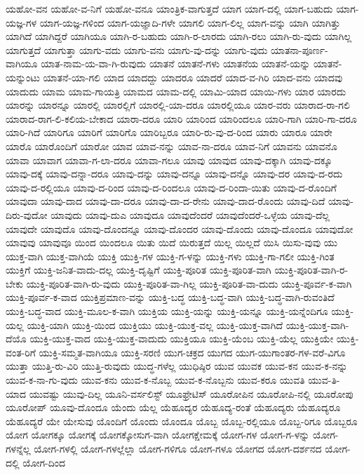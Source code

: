 {ಯಹೋ-ವನ
ಯಹೋ-ವ-ನಿಗೆ
ಯಹೋ-ವನೂ
ಯಾಂತ್ರಿಕ-ವಾಗುತ್ತದೆ
ಯಾಗ
ಯಾಗ-ದಲ್ಲಿ
ಯಾಗ-ಬಹುದು
ಯಾಗ-ಯಜ್ಞ-ಗಳ
ಯಾಗ-ಯಜ್ಞ-ಗಳಿಂದ
ಯಾಗ-ಯಜ್ಞಾದಿ-ಗಳೇ
ಯಾಗಲಿ
ಯಾಗ-ಲಿಲ್ಲ
ಯಾಗ-ವನ್ನು
ಯಾಗಿ
ಯಾಗಿತ್ತು
ಯಾಗಿದೆ
ಯಾಗಿದ್ದರೆ
ಯಾಗಿಯೂ
ಯಾಗಿ-ರ-ಬಹುದು
ಯಾಗಿ-ರ-ಲಾರದು
ಯಾಗಿ-ರಲು
ಯಾಗಿ-ರು-ವುದು
ಯಾಗಿಲ್ಲ
ಯಾಗುತ್ತದೆ
ಯಾಗುತ್ತಾ
ಯಾಗು-ವದು
ಯಾಗು-ವನು
ಯಾಗು-ವು-ದನ್ನು
ಯಾಗು-ವುದು
ಯಾತನಾ-ಪೂರ್ಣ-ವಾಗಿಯೂ
ಯಾತ-ನಾಮ-ಯ-ವಾ-ಗಿ-ರುವುದು
ಯಾತನೆ
ಯಾತನೆ-ಗಳು
ಯಾತನೆಯ
ಯಾತನೆ-ಯನ್ನು
ಯಾತನೆ-ಯನ್ನುಂಟು
ಯಾತನೆ-ಯಾ-ಗಲಿ
ಯಾದ
ಯಾದದ್ದು
ಯಾದರೂ
ಯಾದರೆ
ಯಾದ-ವ-ಗಿರಿ
ಯಾದ-ವನು
ಯಾದವು
ಯಾದುದು
ಯಾಮ
ಯಾಮ-ಗಾಯತ್ರಿ
ಯಾಮದ
ಯಾಮ-ದಲ್ಲಿ
ಯಾಮಿ-ಯಾದ
ಯಾಯಿ-ಗಳು
ಯಾರ
ಯಾರದು
ಯಾರನ್ನು
ಯಾರನ್ನೂ
ಯಾರಲ್ಲಿ
ಯಾರಲ್ಲಿಗೆ
ಯಾರಲ್ಲಿ-ಯಾ-ದರೂ
ಯಾರಲ್ಲಿಯೂ
ಯಾರ-ವರು
ಯಾರಾದ-ರಾ-ಗಲಿ
ಯಾರಾದ-ರಾಗ-ಲಿ-ಕಲಿಯ-ಬೇಕಾದ
ಯಾರಾ-ದರೂ
ಯಾರಿ
ಯಾರಿಂದ
ಯಾರಿಂದಲೂ
ಯಾರಿ-ಗಾಗಿ
ಯಾರಿ-ಗಾ-ದರೂ
ಯಾರಿ-ಗಿದೆ
ಯಾರಿಗೂ
ಯಾರಿಗೆ
ಯಾರಿಗೊ
ಯಾರಿಬ್ಬರೂ
ಯಾರಿ-ರು-ವು-ದ-ರಿಂದ
ಯಾರು
ಯಾರೂ
ಯಾರೇ
ಯಾರೊ
ಯಾರೊಂದಿಗೆ
ಯಾರೋ
ಯಾವ
ಯಾವ-ನನ್ನು
ಯಾವ-ನಾ-ದರೂ
ಯಾವ-ನಿಗೆ
ಯಾವನು
ಯಾವನೊ
ಯಾವಾ
ಯಾವಾಗ
ಯಾವಾ-ಗ-ಲಾ-ದರೂ
ಯಾವಾ-ಗಲೂ
ಯಾವು
ಯಾವುದ
ಯಾವು-ದಕ್ಕಾಗಿ
ಯಾವು-ದಕ್ಕೂ
ಯಾವು-ದಕ್ಕೆ
ಯಾವು-ದನ್ನಾ-ದರೂ
ಯಾವು-ದನ್ನು
ಯಾವು-ದನ್ನೂ
ಯಾವು-ದನ್ನೊ
ಯಾವು-ದರ
ಯಾವು-ದ-ರದು
ಯಾವು-ದ-ರಲ್ಲಿಯೂ
ಯಾವು-ದ-ರಿಂದ
ಯಾವು-ದ-ರಿಂದಲೂ
ಯಾವು-ದ-ರಿಂದಾ-ಯಿತು
ಯಾವು-ದ-ರೊಂದಿಗೆ
ಯಾವುದಾ
ಯಾವು-ದಾದ
ಯಾವು-ದಾ-ದರೂ
ಯಾವು-ದಾ-ದ-ರೇನು
ಯಾವು-ದಾದ-ರೊಂದು
ಯಾವು-ದಿದೆ
ಯಾವು-ದಿರು-ವುದೋ
ಯಾವುದು
ಯಾವು-ದುಎ
ಯಾವುದೂ
ಯಾವುದೆಂದರೆ
ಯಾವುದೆಂದರೆ-ಒಳ್ಳೆಯ
ಯಾವು-ದೆಲ್ಲ
ಯಾವುದೇ
ಯಾವುದೊ
ಯಾವು-ದೊಂದನ್ನೂ
ಯಾವು-ದೊಂದರ
ಯಾವು-ದೊಂದು
ಯಾವು-ದೊಂದೂ
ಯಾವುದೋ
ಯಾವುವು
ಯಾವುವೂ
ಯಿಂದ
ಯಿಂದಲೂ
ಯಿತು
ಯಿದೆ
ಯಿರುತ್ತದೆ
ಯಿಲ್ಲ
ಯಿಲ್ಲದೆ
ಯಿಸಿ
ಯಿಸು-ವುವು
ಯು
ಯುಕ್ತ-ವಾಗಿ
ಯುಕ್ತ-ವಾಗಿಯೆ
ಯುಕ್ತಿ
ಯುಕ್ತಿ-ಗಳ
ಯುಕ್ತಿ-ಗ-ಳನ್ನು
ಯುಕ್ತಿ-ಗಳು
ಯುಕ್ತಿ-ಗಾ-ಗಲೀ
ಯುಕ್ತಿ-ಗಿಂತ
ಯುಕ್ತಿಗೆ
ಯುಕ್ತಿ-ಜನಿತ-ವಾದು-ದಲ್ಲ
ಯುಕ್ತಿ-ದೃಷ್ಟಿಗೆ
ಯುಕ್ತಿ-ಪೂರಿತ
ಯುಕ್ತಿ-ಪೂರಿತ-ವಾಗಿ
ಯುಕ್ತಿ-ಪೂರಿತ-ವಾಗಿ-ರ-ಬೇಕು
ಯುಕ್ತಿ-ಪೂರಿತ-ವಾಗಿ-ರು-ವುದು
ಯುಕ್ತಿ-ಪೂರಿತ-ವಾ-ಗಿಲ್ಲ
ಯುಕ್ತಿ-ಪೂರಿತ-ವಾ-ದುದು
ಯುಕ್ತಿ-ಪೂರ್ವ-ಕ-ವಾಗಿ
ಯುಕ್ತಿ-ಪೂರ್ವ-ಕ-ವಾದ
ಯುಕ್ತಿಪ್ರಮಾಣ-ವನ್ನು
ಯುಕ್ತಿ-ಬದ್ಧ
ಯುಕ್ತಿ-ಬದ್ಧ-ವಾಗಿ
ಯುಕ್ತಿ-ಬದ್ಧ-ವಾಗಿ-ರುವಂತಿದೆ
ಯುಕ್ತಿ-ಬದ್ಧ-ವಾದ
ಯುಕ್ತಿ-ಮೂಲ-ಕ-ವಾಗಿ
ಯುಕ್ತಿಯ
ಯುಕ್ತಿ-ಯನ್ನು
ಯುಕ್ತಿ-ಯನ್ನೂ
ಯುಕ್ತಿ-ಯನ್ನೆಂದಿಗೂ
ಯುಕ್ತಿ-ಯಲ್ಲ
ಯುಕ್ತಿ-ಯಾಗಿ
ಯುಕ್ತಿ-ಯಿಂದ
ಯುಕ್ತಿಯು
ಯುಕ್ತಿ-ಯುಕ್ತ-ವಲ್ಲ
ಯುಕ್ತಿ-ಯುಕ್ತ-ವಾಗಿದೆ
ಯುಕ್ತಿ-ಯುಕ್ತ-ವಾಗಿ-ದೆಯೊ
ಯುಕ್ತಿ-ಯುಕ್ತ-ವಾದ
ಯುಕ್ತಿ-ಯುಕ್ತ-ವಾದುದು
ಯುಕ್ತಿಯೂ
ಯುಕ್ತಿ-ಯೆಂಬ
ಯುಕ್ತಿ-ಯೆಲ್ಲ
ಯುಕ್ತಿಯೇ
ಯುಕ್ತಿ-ವಂತ-ರಿಗೆ
ಯುಕ್ತಿ-ಸಮ್ಮತ-ವಾಗಿಯೂ
ಯುಕ್ತಿ-ಸರಣಿ
ಯುಗ-ಚಕ್ರದ
ಯುಗದ
ಯುಗ-ಯುಗಾಂತರ-ಗಳ-ವರೆ-ವಿಗೂ
ಯುತ್ತಾ
ಯುತ್ತಿ-ರು-ವಿರಿ
ಯುತ್ತಿ-ರುವುದು
ಯುದ್ಧ-ಗಳೆಲ್ಲ
ಯುಧಿಷ್ಠಿರ
ಯುವ
ಯುವಕ
ಯುವ-ಕನ
ಯುವ-ಕ-ನನ್ನು
ಯುವ-ಕ-ನಾ-ಗು-ವುದು
ಯುವ-ಕನು
ಯುವ-ಕ-ನೊಬ್ಬ
ಯುವ-ಕ-ನೊಬ್ಬನು
ಯುವ-ಕರೂ
ಯುವತಿ
ಯುವ-ತಿ-ಯಾದ
ಯುವಷ್ಟು
ಯುವು-ದಿಲ್ಲ
ಯೂನಿ-ವರ್ಸಲಿಸ್ಟ್
ಯೂಫ್ರೇಟಿಸ್
ಯೂರೋಪಿನ
ಯೂರೋಪಿ-ನಲ್ಲಿ
ಯೂರೋಪು
ಯೂರೋಪ್
ಯೂವು-ದೊಂದೂ
ಯೆಂದು
ಯೆಲ್ಲ
ಯೆಹೂದ್ಯರ
ಯೆಹೂದ್ಯ-ರಂತೆ
ಯೆಹೂದ್ಯರು
ಯೆಹೂದ್ಯರೂ
ಯೆಹೂದ್ಯರೆ
ಯೇ
ಯೇಸುವು
ಯೊಂದಿಗೆ
ಯೊಂದು
ಯೊಂದೂ
ಯೊಬ್ಬ
ಯೊಬ್ಬ-ರಲ್ಲಿಯೂ
ಯೊಬ್ಬ-ರಿಗೂ
ಯೊಬ್ಬರೂ
ಯೋಗ
ಯೋಗಕ್ಕೂ
ಯೋಗಕ್ಕೆ
ಯೋಗಕ್ಕೋಸುಗ-ವಾಗಿ
ಯೋಗಕ್ಷೇಮಕ್ಕೆ
ಯೋಗ-ಗಳ
ಯೋಗ-ಗ-ಳನ್ನು
ಯೋಗ-ಗಳನ್ನೆಲ್ಲ
ಯೋಗ-ಗಳಲ್ಲಿ
ಯೋಗ-ಗಳಲ್ಲೆಲ್ಲಾ
ಯೋಗ-ಗಳಿಗೂ
ಯೋಗ-ಗಳೂ
ಯೋಗದ
ಯೋಗ-ದರ್ಶನದ
ಯೋಗ-ದಲ್ಲಿ
ಯೋಗ-ದಿಂದ
}
